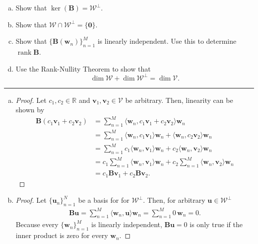 \documentclass[12pt]{amsart}
\newcommand{\1}{\mathbbm{1}}
\newcounter{Theorem}
\numberwithin{equation}{section}
\numberwithin{Theorem}{section}
\theoremstyle{plain} %
\theoremstyle{definition}
\theoremstyle{remark}
\begin{document}
\begin{enumerate}[1.]
\begin{enumerate}[(a)]
\item Show that \(\operatorname{ker}(\mathbf{B}) = \mathcal{W}^{\bot}\).\medskip

\item Show that \(\mathcal{W}\cap\mathcal{W}^{\bot}=\{\mathbf{0}\}\).\medskip

\item Show that \(\{\mathbf{B}(\mathbf{w}_{n})\}_{n=1}^{M}\) is linearly independent. Use this to determine \(\operatorname{rank}\mathbf{B}\).\medskip

\item Use the Rank-Nullity Theorem to show that
\[\dim\mathcal{W} + \dim\mathcal{W}^{\bot} = \dim\mathcal{V}.\]

\end{enumerate}\bigskip

\hrule
\bigskip
\begin{enumerate}[(a)]
	\item 
	\begin{proof}
	Let \(c_1,c_2\in\mathbb{R}\) and \(\mathbf{v}_1,\mathbf{v}_2\in\mathcal{V}\) be arbitrary. Then, linearity can be shown by
	\begin{align*}
		\mathbf{B}(c_1\mathbf{v}_1+c_2\mathbf{v}_2)
		&= \sum_{n=1}^{M} \langle \mathbf{w}_n, c_1\mathbf{v}_1+c_2\mathbf{v}_2 \rangle\mathbf{w}_n \\
		&= \sum_{n=1}^{M} \langle \mathbf{w}_n, c_1\mathbf{v}_1 \rangle\mathbf{w}_n + \langle \mathbf{w}_n,c_2\mathbf{v}_2 \rangle\mathbf{w}_n \\
		&= \sum_{n=1}^{M} c_1\langle \mathbf{w}_n,\mathbf{v}_1 \rangle\mathbf{w}_n + c_2\langle \mathbf{w}_n,\mathbf{v}_2 \rangle\mathbf{w}_n \\
		&=  c_1\sum_{n=1}^{M}\langle \mathbf{w}_n,\mathbf{v}_1 \rangle\mathbf{w}_n + c_2\sum_{n=1}^{M}\langle \mathbf{w}_n,\mathbf{v}_2 \rangle\mathbf{w}_n \\
		&= c_1\mathbf{B}\mathbf{v}_1 + c_2\mathbf{B}\mathbf{v}_2 .
	\end{align*}
	\end{proof}

	\item 
	\begin{proof}
	Let \(\{\mathbf{u}_n\}_{n=1}^N\) be a basis for for \(\mathcal{W}^\perp\). Then, for arbitrary \(\mathbf{u}\in\mathcal{W}^\perp\)
	\begin{align*}
		\mathbf{B}\mathbf{u}
		= \sum_{n=1}^{M} \langle \mathbf{w}_n,\mathbf{u} \rangle\mathbf{w}_n
		= \sum_{n=1}^{M} 0 \, \mathbf{w}_n
		= 0 .
	\end{align*}
	Because every \(\{\mathbf{w}_{n}\}_{n=1}^{M}\) is linearly independent, \(\mathbf{B}\mathbf{u}=0\) is only true if the inner product is zero for every
	\(\mathbf{w}_{n}\). 
	\end{proof}


\end{enumerate}
\end{enumerate}
\end{document}
